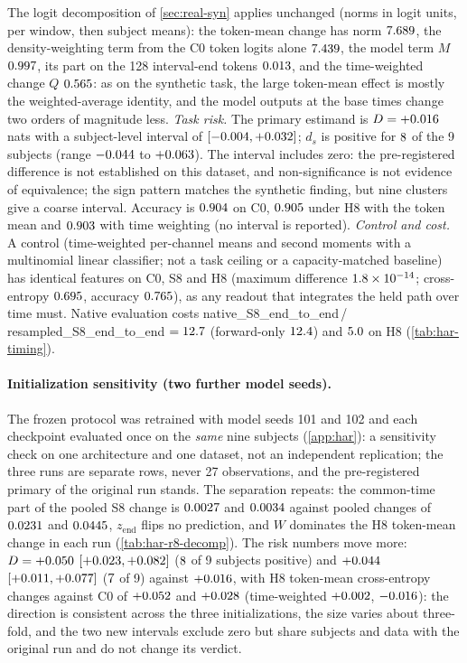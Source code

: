\documentclass{article}
\theoremstyle{plain}
\theoremstyle{definition}
\theoremstyle{remark}
\begin{document}
The logit decomposition of \cref{sec:real-syn} applies unchanged (norms in logit units, per window, then subject means): the token-mean change has norm $7.689$, the density-weighting term from the C0 token logits alone $7.439$, the model term $M$ $0.997$, its part on the 128 interval-end tokens $0.013$, and the time-weighted change $Q$ $0.565$: as on the synthetic task, the large token-mean effect is mostly the weighted-average identity, and the model outputs at the base times change two orders of magnitude less.
\emph{Task risk.}
The primary estimand is $D=+0.016$ nats with a subject-level interval of $[-0.004,+0.032]$; $d_s$ is positive for $8$ of the 9 subjects (range $-0.044$ to $+0.063$).
The interval includes zero: the pre-registered difference is not established on this dataset, and non-significance is not evidence of equivalence; the sign pattern matches the synthetic finding, but nine clusters give a coarse interval.
Accuracy is $0.904$ on C0, $0.905$ under H8 with the token mean and $0.903$ with time weighting (no interval is reported).
\emph{Control and cost.}
A control (time-weighted per-channel means and second moments with a multinomial linear classifier; not a task ceiling or a capacity-matched baseline) has identical features on C0, S8 and H8 (maximum difference $1.8\times10^{-14}$; cross-entropy $0.695$, accuracy $0.765$), as any readout that integrates the held path over time must.
Native evaluation costs native\_S8\_end\_to\_end\,/\,resampled\_S8\_end\_to\_end $=12.7$ (forward-only $12.4$) and $5.0$ on H8 (\cref{tab:har-timing}).

\paragraph{Initialization sensitivity (two further model seeds).}
The frozen protocol was retrained with model seeds 101 and 102 and each checkpoint evaluated once on the \emph{same} nine subjects (\cref{app:har}): a sensitivity check on one architecture and one dataset, not an independent replication; the three runs are separate rows, never 27 observations, and the pre-registered primary of the original run stands.
The separation repeats: the common-time part of the pooled S8 change is $0.0027$ and $0.0034$ against pooled changes of $0.0231$ and $0.0445$, $z_{\mathrm{end}}$ flips no prediction, and $W$ dominates the H8 token-mean change in each run (\cref{tab:har-r8-decomp}).
The risk numbers move more: $D=+0.050$ $[+0.023,+0.082]$ ($8$ of 9 subjects positive) and $+0.044$ $[+0.011,+0.077]$ ($7$ of 9) against $+0.016$, with H8 token-mean cross-entropy changes against C0 of $+0.052$ and $+0.028$ (time-weighted $+0.002$, $-0.016$): the direction is consistent across the three initializations, the size varies about three-fold, and the two new intervals exclude zero but share subjects and data with the original run and do not change its verdict.
\end{document}
